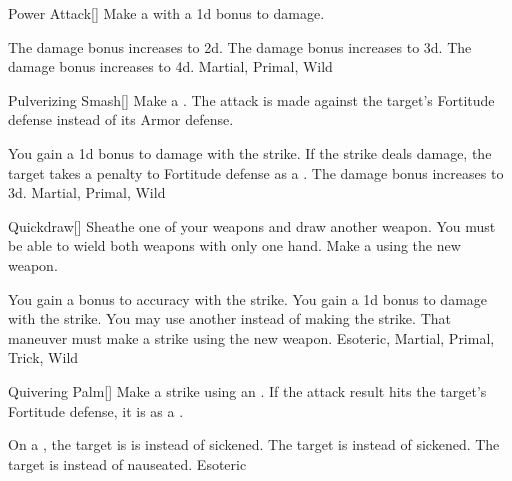 \lowercase{\hypertarget{maneuver:Power Attack}{}}\label{maneuver:Power Attack}
\hypertarget{maneuver:Power Attack}{}
\begin{freeability}{Power Attack}[]
Make a  with a \plus1d bonus to damage.

\rankline
{} The damage bonus increases to \plus2d.
 The damage bonus increases to \plus3d.
 The damage bonus increases to \plus4d.
 Martial, Primal, Wild
\end{freeability}
\vspace{0.25em}



\lowercase{\hypertarget{maneuver:Pulverizing Smash}{}}\label{maneuver:Pulverizing Smash}
\hypertarget{maneuver:Pulverizing Smash}{}
\begin{freeability}{Pulverizing Smash}[]
Make a .
The attack is made against the target's Fortitude defense instead of its Armor defense.

\rankline
{} You gain a \plus1d bonus to damage with the strike.
 If the strike deals damage, the target takes a  penalty to Fortitude defense as a .
 The damage bonus increases to \plus3d.
 Martial, Primal, Wild
\end{freeability}
\vspace{0.25em}



\lowercase{\hypertarget{maneuver:Quickdraw}{}}\label{maneuver:Quickdraw}
\hypertarget{maneuver:Quickdraw}{}
\begin{freeability}{Quickdraw}[]
Sheathe one of your weapons and draw another weapon.
You must be able to wield both weapons with only one hand.
Make a  using the new weapon.

\rankline
{} You gain a  bonus to accuracy with the strike.
 You gain a \plus1d bonus to damage with the strike.
 You may use another  instead of making the strike.
That maneuver must make a strike using the new weapon.
 Esoteric, Martial, Primal, Trick, Wild
\end{freeability}
\vspace{0.25em}



\lowercase{\hypertarget{maneuver:Quivering Palm}{}}\label{maneuver:Quivering Palm}
\hypertarget{maneuver:Quivering Palm}{}
\begin{freeability}{Quivering Palm}[]
Make a strike using an .
If the attack result hits the target's Fortitude defense,
it is  as a .

\rankline
{} On a , the target is is  instead of sickened.
 The target is  instead of sickened.
 The target is  instead of nauseated.
 Esoteric
\end{freeability}
\vspace{0.25em}



